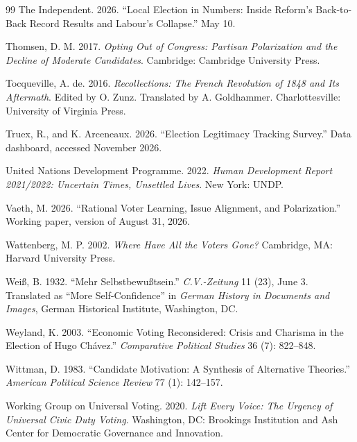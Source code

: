 \documentclass[12pt,letterpaper]{article}
\begin{document}
\begin{thebibliography}{99}
The Independent. 2026. ``Local Election in Numbers: Inside Reform's Back-to-Back Record Results and Labour's Collapse.'' May 10.

Thomsen, D. M. 2017. \textit{Opting Out of Congress: Partisan Polarization and the Decline of Moderate Candidates}. Cambridge: Cambridge University Press.

Tocqueville, A. de. 2016. \textit{Recollections: The French Revolution of 1848 and Its Aftermath}. Edited by O. Zunz. Translated by A. Goldhammer. Charlottesville: University of Virginia Press.

Truex, R., and K. Arceneaux. 2026. ``Election Legitimacy Tracking Survey.'' Data dashboard, accessed November 2026.

United Nations Development Programme. 2022. \textit{Human Development Report 2021/2022: Uncertain Times, Unsettled Lives}. New York: UNDP.

Vaeth, M. 2026. ``Rational Voter Learning, Issue Alignment, and Polarization.'' Working paper, version of August 31, 2026.

Wattenberg, M. P. 2002. \textit{Where Have All the Voters Gone?} Cambridge, MA: Harvard University Press.

Wei{\ss}, B. 1932. ``Mehr Selbstbewu{\ss}tsein.'' \textit{C.V.-Zeitung} 11 (23), June 3. Translated as ``More Self-Confidence'' in \textit{German History in Documents and Images}, German Historical Institute, Washington, DC.

Weyland, K. 2003. ``Economic Voting Reconsidered: Crisis and Charisma in the Election of Hugo Ch\'{a}vez.'' \textit{Comparative Political Studies} 36 (7): 822--848.

Wittman, D. 1983. ``Candidate Motivation: A Synthesis of Alternative Theories.'' \textit{American Political Science Review} 77 (1): 142--157.

Working Group on Universal Voting. 2020. \textit{Lift Every Voice: The Urgency of Universal Civic Duty Voting}. Washington, DC: Brookings Institution and Ash Center for Democratic Governance and Innovation.


\end{thebibliography}
\end{document}
